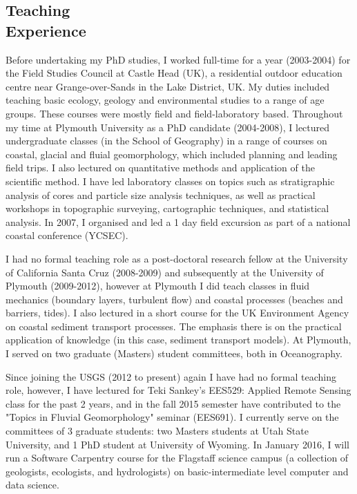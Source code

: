 \documentclass[margin,line]{resume}
\begin{document}
\begin{resume}
    \section{\mysidestyle Teaching \\ Experience}
        \begin{footnotesize}

Before undertaking my PhD studies, I worked full-time for a year (2003-2004) for the Field Studies Council at Castle Head (UK), a residential outdoor education centre near Grange-over-Sands in the Lake District, UK. My duties included teaching basic ecology, geology and environmental studies to a range of age groups. These courses were mostly field and field-laboratory based. Throughout my time at Plymouth University as a PhD candidate (2004-2008), I lectured undergraduate classes (in the School of Geography) in a range of courses on coastal, glacial and fluial geomorphology, which included planning and leading field trips. I also lectured on quantitative methods and application of the scientific method. I have led laboratory classes on topics such as stratigraphic analysis of cores and particle size analysis techniques, as well as practical workshops in topographic surveying, cartographic techniques, and statistical analysis. In 2007, I organised and led a 1 day field excursion as part of a national coastal conference (YCSEC).

I had no formal teaching role as a post-doctoral research fellow at the University of California Santa Cruz (2008-2009) and subsequently at the University of Plymouth (2009-2012), however at Plymouth I did teach classes in fluid mechanics (boundary layers, turbulent flow) and coastal processes (beaches and barriers, tides). I also lectured in a short course for the UK Environment Agency on coastal sediment transport processes. The emphasis there is on the practical application of knowledge (in this case, sediment transport models). At Plymouth, I served on two graduate (Masters) student committees, both in Oceanography.

Since joining the USGS (2012 to present) again I have had no formal teaching role, however, I have lectured for Teki Sankey's EES529: Applied Remote Sensing class for the past 2 years, and in the fall 2015 semester have contributed to the "Topics in Fluvial Geomorphology" seminar (EES691). I currently serve on the committees of 3 graduate students: two Masters students at Utah State University, and 1 PhD student at University of Wyoming. In January 2016, I will run a Software Carpentry course for the Flagstaff science campus (a collection of geologists, ecologists, and hydrologists) on basic-intermediate level computer and data science. 


\end{footnotesize}
\end{resume}
\end{document}
